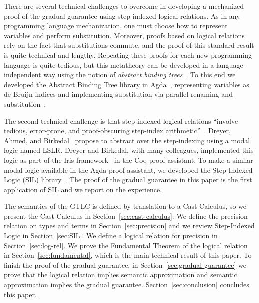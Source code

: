 \documentclass[submission,copyright,creativecommons]{eptcs}
\begin{document}
There are several technical challenges to overcome in developing a
mechanized proof of the gradual guarantee using step-indexed logical
relations. As in any programming language mechanization, one must
choose how to represent variables and perform substitution. Moreover,
proofs based on logical relations rely on the fact that substitutions
commute, and the proof of this standard result is quite technical and
lengthy. Repeating these proofs for each new programming language is
quite tedious, but this metatheory can be developed in a
language-independent way using the notion of \emph{abstract binding
  trees}~\cite{Harper:2012aa}. To this end we developed the Abstract
Binding Tree library in Agda~\cite{Siek:2021to}, representing
variables as de Bruijn indices and implementing substitution via
parallel renaming and
substitution~\cite{McBride:2005aa,Wadler:2020aa}.

The second technical challenge is that step-indexed logical relations
``involve tedious, error-prone, and proof-obscuring step-index
arithmetic''~\cite{Dreyer:2011wl}. Dreyer, Ahmed, and
Birkedal~\cite{Dreyer:2011wl} propose to abstract over the
step-indexing using a modal logic named LSLR. Dreyer and Birkedal,
with many colleagues, implemented this logic as part of the Iris
framework~\cite{JUNG:2018aa} in the Coq proof assistant. To make a
similar modal logic available in the Agda proof assistant, we
developed the Step-Indexed Logic (SIL) library~\cite{Siek:2023aa}.
The proof of the gradual guarantee in this paper is the first
application of SIL and we report on the experience.

The semantics of the GTLC is defined by translation to a Cast
Calculus, so we present the Cast Calculus in
Section~\ref{sec:cast-calculus}. We define the precision relation on
types and terms in Section~\ref{sec:precision} and we review
Step-Indexed Logic in Section~\ref{sec:SIL}.  We define a logical
relation for precision in Section~\ref{sec:log-rel}. We prove the
Fundamental Theorem of the logical relation in
Section~\ref{sec:fundamental}, which is the main technical result of
this paper. To finish the proof of the gradual guarantee, in
Section~\ref{sec:gradual-guarantee} we prove that the logical relation
implies semantic approximation and semantic approximation implies the
gradual guarantee. Section~\ref{sec:conclusion} concludes this paper.









\end{document}
